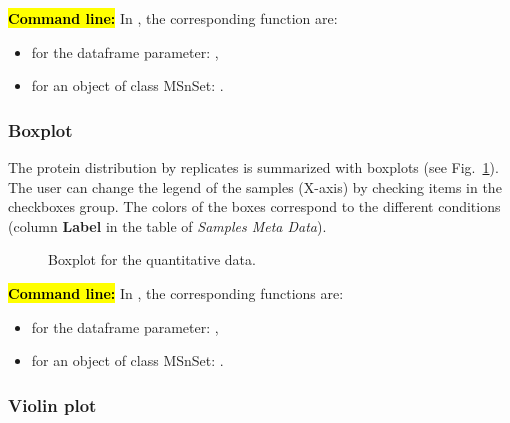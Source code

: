 \documentclass[12pt]{article}
\begin{document}
\hl{\bf Command line:} In , the corresponding function are:
\begin{itemize}
\item for the dataframe parameter: ,
\item for an object of class MSnSet: .
\end{itemize}


\subsubsection {Boxplot}\label{sec:boxplot}

The protein distribution by replicates is summarized with boxplots 
(see Fig.~\ref{fig:boxplot}). The user can change the legend of the samples 
(X-axis) by checking items in the checkboxes group. The colors of the boxes 
correspond to the different conditions (column \textbf{Label} in the table of 
\emph {Samples Meta Data}).

\begin {figure}
\centering
{}
\caption{Boxplot for the quantitative data.}\label{fig:boxplot}
\end {figure}



\hl{\bf Command line:} In , the corresponding functions are:
\begin{itemize}
\item for the dataframe parameter: ,
\item for an object of class MSnSet: .
\end{itemize}



\subsubsection {Violin plot}\label{sec:violinplot}
\end{document}
